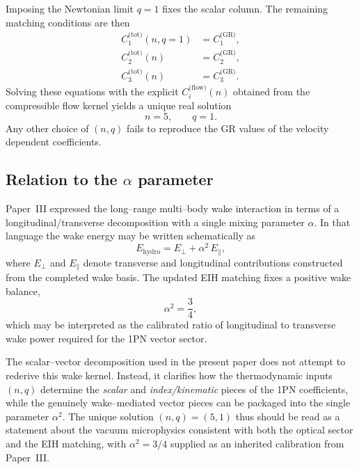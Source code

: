 \documentclass[11pt]{article}
\begin{document}
Imposing the Newtonian limit \(q = 1\) fixes the scalar column.  The
remaining matching conditions are then
\begin{align}
  C_{1}^{\text{(tot)}}(n,q=1)
  &= C_{1}^{\text{(GR)}}, \\
  C_{2}^{\text{(tot)}}(n)
  &= C_{2}^{\text{(GR)}}, \\
  C_{3}^{\text{(tot)}}(n)
  &= C_{3}^{\text{(GR)}}.
\end{align}
Solving these equations with the explicit \(C_{i}^{\text{(flow)}}(n)\)
obtained from the compressible flow kernel yields a unique real solution
\begin{equation}
  n = 5,
  \qquad
  q = 1.
\end{equation}
Any other choice of \((n,q)\) fails to reproduce the GR values of the
velocity dependent coefficients.

\subsection{Relation to the \texorpdfstring{$\alpha$}{alpha} parameter}
\label{app:alpha-relation}

Paper~III expressed the long--range multi--body wake interaction in terms of a
longitudinal/transverse decomposition with a single mixing parameter \(\alpha\).
In that language the wake energy may be written schematically as
\begin{equation}
  E_{\text{hydro}}
  = E_{\perp} + \alpha^2\,E_{\parallel},
\end{equation}
where \(E_{\perp}\) and \(E_{\parallel}\) denote transverse and longitudinal
contributions constructed from the completed wake basis.  The updated EIH
matching fixes a positive wake balance,
\begin{equation}
  \alpha^2 = \frac{3}{4},
\end{equation}
which may be interpreted as the calibrated ratio of longitudinal to transverse
wake power required for the 1PN vector sector.

The scalar--vector decomposition used in the present paper does not attempt to
rederive this wake kernel.  Instead, it clarifies how the thermodynamic inputs
\((n,q)\) determine the \emph{scalar} and \emph{index/kinematic} pieces of the 1PN
coefficients, while the genuinely wake--mediated vector pieces can be packaged
into the single parameter \(\alpha^2\).  The unique solution \((n,q)=(5,1)\) thus
should be read as a statement about the vacuum microphysics consistent with
both the optical sector and the EIH matching, with \(\alpha^2=3/4\) supplied as
an inherited calibration from Paper~III.
\end{document}
